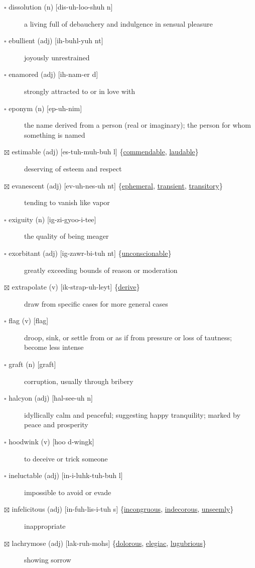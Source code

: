 \documentclass[11pt]{article}
\begin{document}
\begin{description}
\item[{$\square$ dissolution (n) [dis-uh-loo-shuh n]}] a living full of debauchery and indulgence in sensual pleasure
\item[{$\square$ ebullient (adj) [ih-buhl-yuh nt]}] joyously unrestrained
\item[{$\square$ enamored (adj) [ih-nam-er d]}] strongly attracted to or in love with
\item[{$\square$ eponym (n) [ep-uh-nim]}] the name derived from a person (real or imaginary); the person for whom something is named
\item[{$\boxtimes$ \label{org2d83783}estimable (adj) [es-tuh-muh-buh l] \{\hyperref[orge207bcb]{commendable}, \hyperref[org9063730]{laudable}\}}] deserving of esteem and respect
\item[{$\boxtimes$ \label{orgf68fa16}evanescent (adj) [ev-uh-nes-uh nt] \{\hyperref[org70165c8]{ephemeral}, \hyperref[orgb67ac3b]{transient}, \hyperref[org51c6a20]{transitory}\}}] tending to vanish like vapor
\item[{$\square$ exiguity (n) [ig-zi-gyoo-i-tee]}] the quality of being meager
\item[{$\square$ \label{orgb2266c8}exorbitant (adj) [ig-zawr-bi-tuh nt] \{\hyperref[org23bc9ff]{unconscionable}\}}] greatly exceeding bounds of reason or moderation
\item[{$\boxtimes$ \label{org5f38148}extrapolate (v) [ik-strap-uh-leyt] \{\hyperref[org1f5d1d0]{derive}\}}] draw from specific cases for more general cases
\item[{$\square$ flag (v) [flag]}] droop, sink, or settle from or as if from pressure or loss of tautness; become less intense
\item[{$\square$ graft (n) [graft]}] corruption, usually through bribery
\item[{$\square$ halcyon (adj) [hal-see-uh n]}] idyllically calm and peaceful; suggesting happy tranquility; marked by peace and prosperity
\item[{$\square$ hoodwink (v) [hoo d-wingk]}] to deceive or trick someone
\item[{$\square$ \label{orgfcdeb8c}ineluctable (adj) [in-i-luhk-tuh-buh l]}] impossible to avoid or evade
\item[{$\boxtimes$ \label{org04e38e0}infelicitous (adj) [in-fuh-lis-i-tuh s] \{\hyperref[org42977a6]{incongruous}, \hyperref[org6f6aa07]{indecorous}, \hyperref[org5b5b913]{unseemly}\}}] inappropriate
\item[{$\boxtimes$ \label{org622edd6}lachrymose (adj) [lak-ruh-mohs] \{\hyperref[org3018570]{dolorous}, \hyperref[orgd4fea5c]{elegiac}, \hyperref[org1b2c3d1]{lugubrious}\}}] showing sorrow

\end{description}
\end{document}
